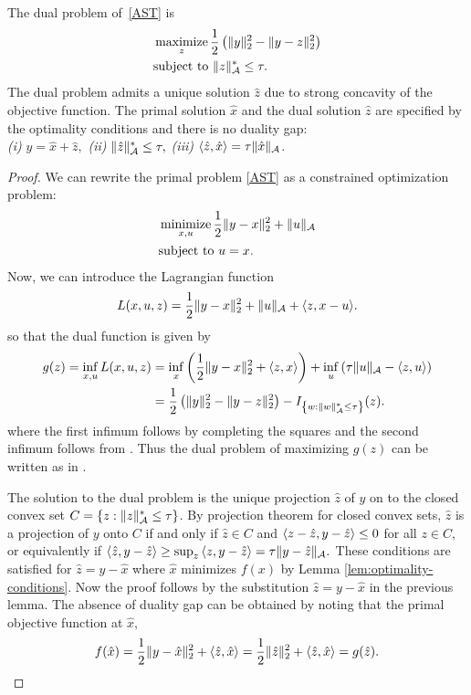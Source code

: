 \begin{lemma} \label{lem:dual-problem} The dual problem
of~\eqref{AST} is
\begin{equation*}
  \label{eq:dual-ast}
  \begin{split} &\mathop{\operatorname{maximize}}_z \frac{1}{2}\left(\lVert y\rVert_2^2 - \lVert y - z\rVert_2^2\right)\\ &\text{subject to } \lVert z\rVert_{\mathcal{A}}^* \leq \tau. \end{split} \end{equation*} 
The dual problem admits a unique solution $\hat{z}$ due to strong concavity of
the objective function. The primal solution $\hat{x}$ and the dual solution
$\hat{z}$ are specified by the optimality conditions and there is no duality
gap:\\
\emph{(i)} $y = \hat{x} + \hat{z},$ 
\emph{(ii)} $\lVert\hat{z}\rVert_{\mathcal{A}}^* \leq \tau,$
\emph{(iii)} $\langle\hat{z}, \hat{x}\rangle = \tau
\lVert\hat{x}\rVert_{\mathcal{A}}$.  \
\end{lemma}
\begin{proof}
We can rewrite the primal problem \eqref{AST} as a constrained optimization problem:
\[
\begin{split}
&\mathop{\operatorname{minimize}}_{x,u} \frac{1}{2}\lVert y - x\rVert_2^2 + \lVert u\rVert_{\mathcal{A}}\\
&\text{subject to }  u = x.
\end{split}
\]
Now, we can introduce the Lagrangian function
\begin{equation*}
L(x,u,z) = \frac{1}{2}\lVert y - x\rVert_2^2 + \lVert u\rVert_{\mathcal{A}} + \langle z, x - u\rangle.
\end{equation*} 
so that the dual function is given by
\begin{align*}
g(z) = \inf_{x,u} L(x,u,z)
& = \inf_{x}\left( \frac{1}{2}\lVert y - x\rVert_2^2 + \langle z, x\rangle \right) 
+ \inf_{u}\left( \tau\lVert u\rVert_{\mathcal{A}} - \langle z, u\rangle \right)\\
& = \frac{1}{2}\left(\lVert y\rVert_2^2 - \lVert y - z\rVert_2^2\right) - I_{\left\{ w : \lVert w\rVert_{\mathcal{A}}^* \leq \tau\right\}}(z).
\end{align*}
where the first infimum follows by completing the squares and the second infimum follows from . Thus the dual problem  of maximizing $g(z)$ can be written as in .

The solution to the dual problem is the unique projection $\hat{z}$ of $y$ on to the closed convex set $C = \{ z : \lVert z\rVert_{\mathcal{A}}^* \leq \tau \}$. By projection theorem for closed convex sets, $\hat{z}$ is a projection of $y$ onto $C$ if and only if $\hat{z} \in C$ and $\langle z - \hat{z}, y - \hat{z}\rangle \leq 0$ for all  $z \in C$, or equivalently if $\langle\hat{z}, y - \hat{z}\rangle \geq \sup_z\,\langle z, y - \hat{z}\rangle = \tau \lVert y - \hat{z}\rVert_{\mathcal{A}}.$
These conditions are satisfied for $\hat{z} = y - \hat{x}$ where $\hat{x}$ minimizes $f(x)$ by Lemma \ref{lem:optimality-conditions}. Now the proof follows by the substitution $\hat{z} = y - \hat{x}$ in the previous lemma. The absence of duality gap can be obtained by noting that the primal objective function at $\hat{x},$
\[
f(\hat{x}) = \frac{1}{2}\lVert y - \hat{x}\rVert_2^2 + \langle\hat{z}, \hat{x}\rangle
= \frac{1}{2}\lVert\hat{z}\rVert_2^2 + \langle\hat{z}, \hat{x}\rangle = g(\hat{z}).
\]
\end{proof}

